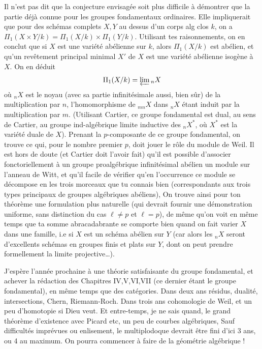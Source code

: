 Il n'est pas dit que la conjecture envisagée soit plus difficile à démontrer que la partie déjà connue pour les groupes fondamentaux ordinaires. Elle impliquerait que pour des schémas complets $X,Y$ au dessus d'un corps alg clos $k$, on a $\Pi_1(X\times Y/k)=\Pi_1(X/k)\times\Pi_1(Y/k)$. Utilisant tes raisonnements, on en conclut que si $X$ est une variété abélienne sur $k$, alors $\Pi_1(X/k)$ est abélien, et qu'un revêtement principal minimal $X'$ de $X$ est une variété abélienne isogène à $X$. On en déduit
\[
\Pi_1(X/k)=\varprojlim {}_nX
\]
où ${}_nX$ est le noyau (avec sa partie infinitésimale aussi, bien sûr) de la multiplication par $n$, l'homomorphisme de ${}_{mn}X$ dans ${}_nX$ étant induit par la multiplication par $m$. (Utilisant Cartier, ce groupe fondamental est dual, au sens de Cartier, au groupe ind-algébrique limite inductive des ${}_nX^*$, où $X^*$ est la variété duale de $X$). Prenant la $p$-composante de ce groupe fondamental, on trouve ce qui, pour le nombre premier $p$, doit jouer le rôle du module de Weil. Il est hors de doute (et Cartier doit l'avoir fait) qu'il est possible d'associer  fonctoriellement à un groupe proalgébrique infinitésimal abélien un module sur l'anneau de Witt, et  qu'il  facile de vérifier qu'en l'occurrence ce module se décompose en les trois morceaux que tu connais bien (correspondants aux trois types principaux de groupes algébriques abéliens),  On trouve ainsi
pour ton théorème une formulation plus naturelle (qui devrait  fournir une démonstration uniforme, sans distinction du cas $\ell\ne p$ et $\ell=p$), de même qu'on voit en même temps que ta somme abracadabrante se comporte bien quand on fait varier $X$ dans une famille, i.e si $X$ est  un schéma abélien sur $Y$ (car alors les ${}_nX$ seront d'excellents schémas en groupes finis et plats sur $Y$, dont on peut prendre formellement la limite projective\ldots).

J'espère  l'année prochaine à une théorie satisfaisante du groupe fondamental,  et achever la rédaction des Chapitres IV,V,VI,VII (ce dernier étant le groupe fondamental), en même temps que des catégories. Dans deux ans résidus, dualité, intersections, Chern, Riemann-Roch. Dans trois ans cohomologie de Weil, et un peu d'homotopie si Dieu veut. Et entre-temps, je ne sais quand, le grand théorème d'existence avec Picard etc, un peu de courbes algébriques,  Sauf difficultés imprévues ou enlisement, le multiplodoque devrait être fini d'ici 3 ans, ou 4 au maximum. On pourra commencer à faire de la géométrie algébrique !

